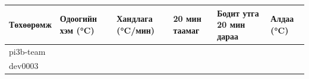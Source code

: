 \begingroup\scriptsize\begin{longtable}[]{@{}llllll@{}}
\toprule
\begin{minipage}[b]{0.14\columnwidth}\raggedright
Төхөөрөмж\strut
\end{minipage} & \begin{minipage}[b]{0.14\columnwidth}\raggedright
Одоогийн хэм (°C)\strut
\end{minipage} & \begin{minipage}[b]{0.14\columnwidth}\raggedright
Хандлага (°C/мин)\strut
\end{minipage} & \begin{minipage}[b]{0.14\columnwidth}\raggedright
20 мин таамаг\strut
\end{minipage} & \begin{minipage}[b]{0.14\columnwidth}\raggedright
Бодит утга 20 мин дараа\strut
\end{minipage} & \begin{minipage}[b]{0.14\columnwidth}\raggedright
Алдаа (°C)\strut
\end{minipage}\tabularnewline
\midrule
\endhead
\begin{minipage}[t]{0.14\columnwidth}\raggedright
pi3b-team\strut
\end{minipage} & \begin{minipage}[t]{0.14\columnwidth}\raggedright
\strut
\end{minipage} & \begin{minipage}[t]{0.14\columnwidth}\raggedright
\strut
\end{minipage} & \begin{minipage}[t]{0.14\columnwidth}\raggedright
\strut
\end{minipage} & \begin{minipage}[t]{0.14\columnwidth}\raggedright
\strut
\end{minipage} & \begin{minipage}[t]{0.14\columnwidth}\raggedright
\strut
\end{minipage}\tabularnewline
\begin{minipage}[t]{0.14\columnwidth}\raggedright
dev0003\strut
\end{minipage} & \begin{minipage}[t]{0.14\columnwidth}\raggedright
\strut
\end{minipage} & \begin{minipage}[t]{0.14\columnwidth}\raggedright
\strut
\end{minipage} & \begin{minipage}[t]{0.14\columnwidth}\raggedright
\strut
\end{minipage} & \begin{minipage}[t]{0.14\columnwidth}\raggedright
\strut
\end{minipage} & \begin{minipage}[t]{0.14\columnwidth}\raggedright
\strut
\end{minipage}\tabularnewline
\bottomrule
\end{longtable}\endgroup

